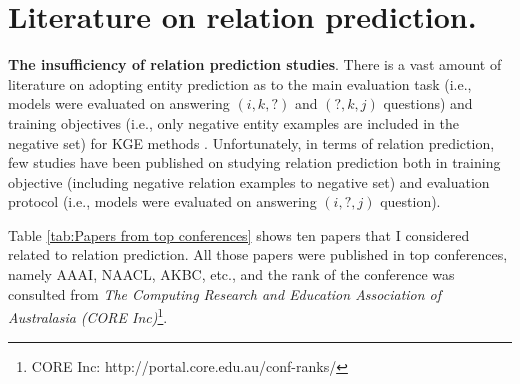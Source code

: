 \section{Literature on relation prediction.}
\noindent\textbf{The insufficiency of relation prediction studies}. There is a vast amount of literature on adopting entity prediction as to the main evaluation task (i.e., models were evaluated on answering $(i,k,?)$ and $(?,k,j)$ questions) and training objectives (i.e., only negative entity examples are included in the negative set) for KGE methods \citep{bordes2013translating, lin2015learning, nickel2016holographic, wang2014knowledge}. Unfortunately, in terms of relation prediction, few studies have been published on studying relation prediction both in training objective (including negative relation examples to negative set) and evaluation protocol (i.e., models were evaluated on answering $(i,?,j)$ question). 

Table \ref{tab:Papers from top conferences} shows ten papers that I considered related to relation prediction. All those papers were published in top conferences, namely AAAI, NAACL, AKBC, etc., and the rank of the conference was consulted from \textit{The Computing Research and Education Association of Australasia (CORE Inc)}\footnote{CORE Inc: http://portal.core.edu.au/conf-ranks/}.

